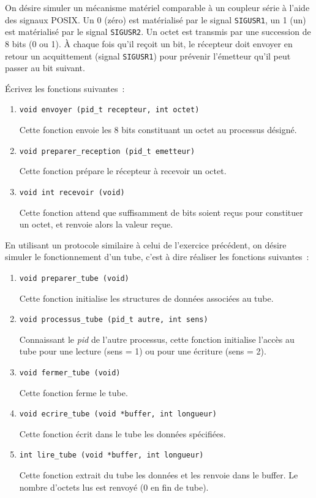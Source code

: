 \question

On désire simuler un mécanisme matériel comparable à un coupleur série
à l'aide des signaux POSIX. Un 0 (zéro) est matérialisé par le signal
{\tt SIGUSR1}, un 1 (un) est matérialisé par le signal {\tt SIGUSR2}.
Un octet est transmis par une succession de 8 bits (0 ou 1).
À chaque fois qu'il reçoit un bit, le récepteur doit envoyer en
retour un acquittement (signal {\tt SIGUSR1}) pour prévenir l'émetteur
qu'il peut passer au bit suivant.

Écrivez les fonctions suivantes~:

\begin {enumerate}
    \item \verb:void envoyer (pid_t recepteur, int octet):

	Cette fonction envoie les 8 bits constituant un octet au
	processus désigné.

    \item \verb:void preparer_reception (pid_t emetteur):

	Cette fonction prépare le récepteur à recevoir un octet.

    \item \verb:void int recevoir (void):

	Cette fonction attend que suffisamment de bits soient reçus
	pour constituer un octet,  et renvoie alors la valeur reçue.

\end {enumerate}


\question

En utilisant un protocole similaire à celui de l'exercice précédent,
on désire simuler le fonctionnement d'un tube, c'est à dire réaliser
les fonctions suivantes~:

\begin {enumerate}
    \item \verb:void preparer_tube (void):

	Cette fonction initialise les structures de données associées
	au tube.

    \item \verb:void processus_tube (pid_t autre, int sens):

	Connaissant le \textit {pid} de l'autre processus, cette
	fonction initialise l'accès au tube pour une lecture (sens
	= 1) ou pour une écriture (sens = 2).

    \item \verb:void fermer_tube (void):

	Cette fonction ferme le tube.

    \item \verb:void ecrire_tube (void *buffer, int longueur):

	Cette fonction écrit dans le tube les données spécifiées.

    \item \verb:int lire_tube (void *buffer, int longueur):

	Cette fonction extrait du tube les données et les renvoie
	dans le buffer. Le nombre d'octets lus est renvoyé (0 en
	fin de tube).

\end {enumerate}


